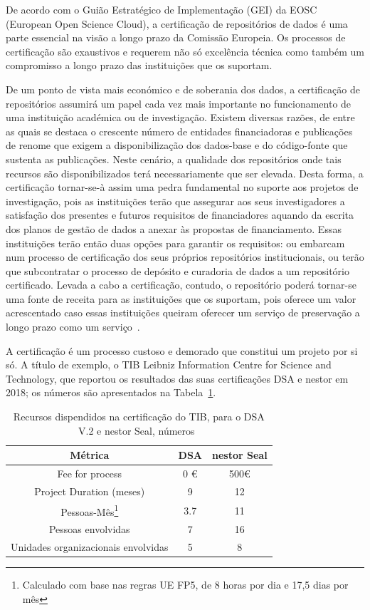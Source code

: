\documentclass[sigconf,nonacm]{acmart}
\begin{document}
De acordo com o Guião Estratégico de Implementação (GEI) da EOSC (European Open Science Cloud), a certificação de repositórios de dados é uma parte essencial na visão a longo prazo da Comissão Europeia. Os processos de certificação são exaustivos e requerem não só excelência técnica como também um compromisso a longo prazo das instituições que os suportam. 

De um ponto de vista mais económico e de soberania dos dados, a certificação de repositórios assumirá um papel cada vez mais importante no funcionamento de uma instituição académica ou de investigação. Existem diversas razões, de entre as quais se destaca o crescente número de entidades financiadoras e publicações de renome que exigem a disponibilização dos dados-base e do código-fonte que sustenta as publicações. Neste cenário, a qualidade dos repositórios onde tais recursos são disponibilizados terá necessariamente que ser elevada. Desta forma, a certificação tornar-se-à assim uma pedra fundamental no suporte aos projetos de investigação, pois as instituições terão que assegurar aos seus investigadores a satisfação dos presentes e futuros requisitos de financiadores aquando da escrita dos planos de gestão de dados a anexar às propostas de financiamento. Essas instituições terão então duas opções para garantir os requisitos: ou embarcam num processo de certificação dos seus próprios repositórios institucionais, ou terão que subcontratar o processo de depósito e curadoria de dados a um repositório certificado. Levada a cabo a certificação, contudo, o repositório poderá tornar-se uma fonte de receita para as instituições que os suportam, pois oferece um valor acrescentado caso essas instituições queiram oferecer um serviço de preservação a longo prazo como um serviço~\cite{Lindlar_Schwab_2019}.

A certificação é um processo custoso e demorado que constitui um projeto por si só. A título de exemplo, o TIB Leibniz Information Centre for Science and Technology, que reportou os resultados das suas certificações DSA e nestor em 2018; os números são apresentados na Tabela~\ref{tab:tib_certification_numbers}.

\begin{table}
    \caption{Recursos dispendidos na certificação do TIB, para o DSA V.2 e nestor Seal, números~\cite{Lindlar_Schwab_2019}}\label{tab:tib_certification_numbers}
    \centering
    \scriptsize
    \begin{tabular}{|c|c|c|}
	\hline
    \textbf{Métrica} & \textbf{DSA} & \textbf{nestor Seal}\\
	\hline
	\hline
	Fee for process & 0 €  & 500€ \\
    Project Duration (meses) & 9 & 12 \\
	Pessoas-Mês\footnote{Calculado com base nas regras UE FP5, de 8 horas por dia e 17,5 dias por mês} & 3.7 & 11\\
	Pessoas envolvidas & 7 & 16\\
	Unidades organizacionais envolvidas & 5 & 8\\
	\hline
    \end{tabular}
    \scriptsize
\end{table}
\end{document}
